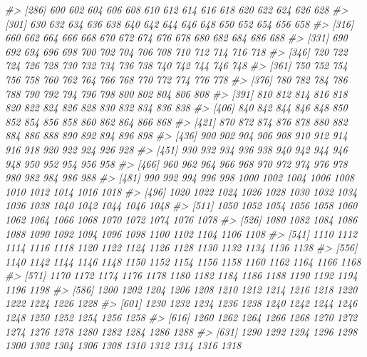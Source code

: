 \documentclass[
]{article}
\newenvironment{Shaded}{\begin{snugshade}}{\end{snugshade}}
\newcommand{\CommentTok}[1]{\textcolor[rgb]{0.56,0.35,0.01}{\textit{#1}}}
\begin{document}
\begin{Shaded}
\begin{Highlighting}[]
\CommentTok{\#\textgreater{} [286]  600  602  604  606  608  610  612  614  616  618  620  622  624  626  628}
\CommentTok{\#\textgreater{} [301]  630  632  634  636  638  640  642  644  646  648  650  652  654  656  658}
\CommentTok{\#\textgreater{} [316]  660  662  664  666  668  670  672  674  676  678  680  682  684  686  688}
\CommentTok{\#\textgreater{} [331]  690  692  694  696  698  700  702  704  706  708  710  712  714  716  718}
\CommentTok{\#\textgreater{} [346]  720  722  724  726  728  730  732  734  736  738  740  742  744  746  748}
\CommentTok{\#\textgreater{} [361]  750  752  754  756  758  760  762  764  766  768  770  772  774  776  778}
\CommentTok{\#\textgreater{} [376]  780  782  784  786  788  790  792  794  796  798  800  802  804  806  808}
\CommentTok{\#\textgreater{} [391]  810  812  814  816  818  820  822  824  826  828  830  832  834  836  838}
\CommentTok{\#\textgreater{} [406]  840  842  844  846  848  850  852  854  856  858  860  862  864  866  868}
\CommentTok{\#\textgreater{} [421]  870  872  874  876  878  880  882  884  886  888  890  892  894  896  898}
\CommentTok{\#\textgreater{} [436]  900  902  904  906  908  910  912  914  916  918  920  922  924  926  928}
\CommentTok{\#\textgreater{} [451]  930  932  934  936  938  940  942  944  946  948  950  952  954  956  958}
\CommentTok{\#\textgreater{} [466]  960  962  964  966  968  970  972  974  976  978  980  982  984  986  988}
\CommentTok{\#\textgreater{} [481]  990  992  994  996  998 1000 1002 1004 1006 1008 1010 1012 1014 1016 1018}
\CommentTok{\#\textgreater{} [496] 1020 1022 1024 1026 1028 1030 1032 1034 1036 1038 1040 1042 1044 1046 1048}
\CommentTok{\#\textgreater{} [511] 1050 1052 1054 1056 1058 1060 1062 1064 1066 1068 1070 1072 1074 1076 1078}
\CommentTok{\#\textgreater{} [526] 1080 1082 1084 1086 1088 1090 1092 1094 1096 1098 1100 1102 1104 1106 1108}
\CommentTok{\#\textgreater{} [541] 1110 1112 1114 1116 1118 1120 1122 1124 1126 1128 1130 1132 1134 1136 1138}
\CommentTok{\#\textgreater{} [556] 1140 1142 1144 1146 1148 1150 1152 1154 1156 1158 1160 1162 1164 1166 1168}
\CommentTok{\#\textgreater{} [571] 1170 1172 1174 1176 1178 1180 1182 1184 1186 1188 1190 1192 1194 1196 1198}
\CommentTok{\#\textgreater{} [586] 1200 1202 1204 1206 1208 1210 1212 1214 1216 1218 1220 1222 1224 1226 1228}
\CommentTok{\#\textgreater{} [601] 1230 1232 1234 1236 1238 1240 1242 1244 1246 1248 1250 1252 1254 1256 1258}
\CommentTok{\#\textgreater{} [616] 1260 1262 1264 1266 1268 1270 1272 1274 1276 1278 1280 1282 1284 1286 1288}
\CommentTok{\#\textgreater{} [631] 1290 1292 1294 1296 1298 1300 1302 1304 1306 1308 1310 1312 1314 1316 1318}

\end{Highlighting}
\end{Shaded}
\end{document}
